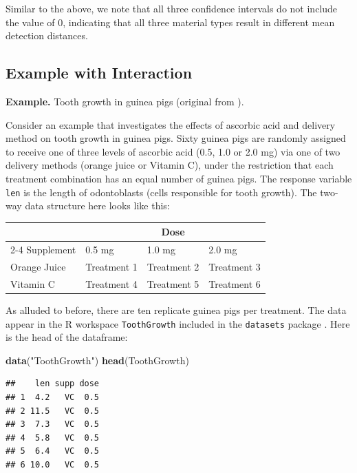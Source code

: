 \documentclass[
]{book}
\newenvironment{Shaded}{\begin{snugshade}}{\end{snugshade}}
\newcommand{\FunctionTok}[1]{\textcolor[rgb]{0.13,0.29,0.53}{\textbf{#1}}}
\newcommand{\NormalTok}[1]{#1}
\newcommand{\StringTok}[1]{\textcolor[rgb]{0.31,0.60,0.02}{#1}}
\begin{document}
Similar to the above, we note that all three confidence intervals do not include the value of 0, indicating that all three material types result in different mean detection distances.

\hypertarget{example-with-interaction}{%
\subsection{Example with Interaction}\label{example-with-interaction}}

\textbf{Example.} Tooth growth in guinea pigs (original from \citet{Crampton-1947}).

Consider an example that investigates the effects of ascorbic acid and delivery method on tooth growth in guinea pigs.
Sixty guinea pigs are randomly assigned to receive one of three levels of ascorbic acid (0.5, 1.0 or 2.0 mg) via one of two delivery methods (orange juice or Vitamin C), under the restriction that each treatment combination has an equal number of guinea pigs.
The response variable \texttt{len} is the length of odontoblasts (cells responsible for tooth growth).
The two-way data structure here looks like this:

\begin{table}
\centering
\begin{tabular}{l|l|l|l}
\hline
\multicolumn{1}{c|}{ } & \multicolumn{3}{c}{Dose} \\
\cline{2-4}
Supplement & 0.5 mg & 1.0 mg & 2.0 mg\\
\hline
Orange Juice & Treatment 1 & Treatment 2 & Treatment 3\\
\hline
Vitamin C & Treatment 4 & Treatment 5 & Treatment 6\\
\hline
\end{tabular}
\end{table}

As alluded to before, there are ten replicate guinea pigs per treatment.
The data appear in the R workspace \texttt{ToothGrowth} included in the \texttt{datasets} package \citep{R-base}.
Here is the head of the dataframe:

\begin{Shaded}
\begin{Highlighting}[]
\FunctionTok{data}\NormalTok{(}\StringTok{"ToothGrowth"}\NormalTok{)}
\FunctionTok{head}\NormalTok{(ToothGrowth)}
\end{Highlighting}
\end{Shaded}

\begin{verbatim}
##    len supp dose
## 1  4.2   VC  0.5
## 2 11.5   VC  0.5
## 3  7.3   VC  0.5
## 4  5.8   VC  0.5
## 5  6.4   VC  0.5
## 6 10.0   VC  0.5
\end{verbatim}
\end{document}
